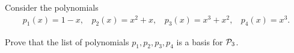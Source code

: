 \begin{question}
    \normalfont

    Consider the polynomials
    \begin{align*}
        p_1(x) = 1-x,\ \ \ \ p_2(x)=x^2+x,\ \ \ \ p_3(x)=x^3+x^2,\ \ \ \ p_4(x)=x^3.
    \end{align*}

    Prove that the list of polynomials $p_1, p_2, p_3, p_4$ \hspace{.1cm} is a basis for $\P_3$.


\end{question}
